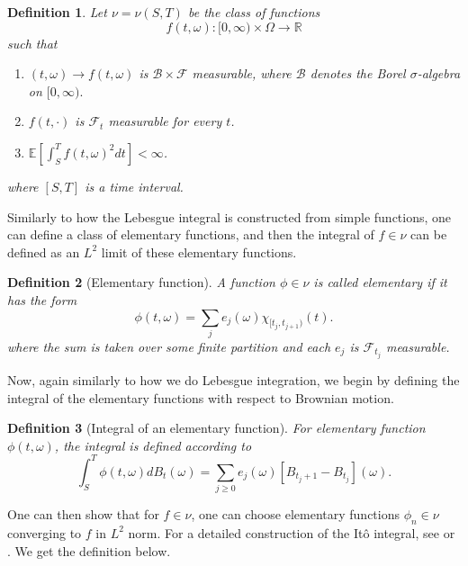 \documentclass[12pt]{article}
\theoremstyle{break}
\newtheorem{definition}{Definition}[section]
\begin{document}
\begin{definition}
	Let $\nu = \nu(S, T)$ be the class of functions
	\begin{equation*}
		f(t, \omega):[0,\infty) \times \Omega \to \mathbb{R}
	\end{equation*}
	such that
	\begin{enumerate}
		\item
			$(t, \omega) \to f(t, \omega)$ is $\mathcal{B} \times \mathcal{F}$ measurable, where $\mathcal{B}$ denotes the Borel $\sigma$-algebra on $[0, \infty).$
		\item
			$f(t, \cdot)$ is $\mathcal{F}_t$ measurable for every $t$.
		\item 
			$\mathbb{E}[\int_S^T f(t, \omega)^2 dt] < \infty$.
	\end{enumerate}
	where $[S, T]$ is a time interval.
\end{definition}

Similarly to how the Lebesgue integral is constructed from simple functions, one can define a class of elementary functions, and then the integral of $f \in \nu$ can be defined as an $L^2$ limit of these elementary functions. 
\begin{definition}[Elementary function]
	A function $\phi \in \nu$ is called elementary if it has the form
	\begin{equation}
		\phi(t, \omega) = \sum_j e_j(\omega) \chi_{[t_j, t_{j+1})}(t).
	\end{equation}
	where the sum is taken over some finite partition and each $e_j$ is $\mathcal{F}_{t_j}$ measurable.
\end{definition}

Now, again similarly to how we do Lebesgue integration, we begin by defining the integral of the elementary functions with respect to Brownian motion.

\begin{definition}[Integral of an elementary function]
	For elementary function $\phi(t, \omega)$, the integral is defined according to
	\begin{equation}
		\int_S^T \phi(t, \omega) dB_t(\omega) = \sum_{j \geq 0} e_j(\omega)[B_{t_j + 1} - B_{t_j}](\omega).
	\end{equation}
\end{definition}

One can then show that for $f \in \nu$, one can choose elementary functions $\phi_n \in \nu$ converging to $f$ in $L^2$ norm. For a detailed construction of the Itô integral, see \cite{oksendal2013} or \cite{karatzas1998}. We get the definition below.
\end{document}
